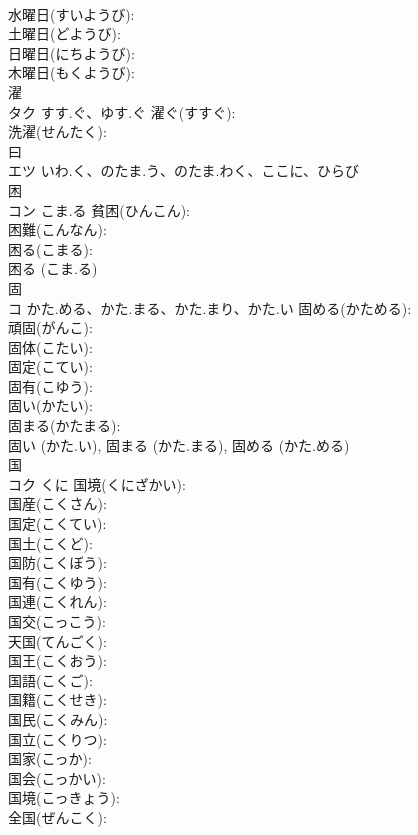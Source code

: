 \documentclass[8pt]{extreport}
\begin{document}
\begin{CJK}{UTF8}{min}
\\	水曜日(すいようび): 
\\	土曜日(どようび): 
\\	日曜日(にちようび): 
\\	木曜日(もくようび): 
\\	濯			
\\	タク	すす.ぐ、ゆす.ぐ	濯ぐ(すすぐ): 
\\	洗濯(せんたく): 
\\	曰			
\\	エツ	いわ.く、のたま.う、のたま.わく、ここに、ひらび		
\\	困			
\\	コン	こま.る	貧困(ひんこん): 
\\	困難(こんなん): 
\\	困る(こまる): 
\\	困る (こま.る)
\\	固			
\\	コ	かた.める、かた.まる、かた.まり、かた.い	固める(かためる): 
\\	頑固(がんこ): 
\\	固体(こたい): 
\\	固定(こてい): 
\\	固有(こゆう): 
\\	固い(かたい): 
\\	固まる(かたまる): 
\\	固い (かた.い), 固まる (かた.まる), 固める (かた.める)
\\	国			
\\	コク	くに	国境(くにざかい): 
\\	国産(こくさん): 
\\	国定(こくてい): 
\\	国土(こくど): 
\\	国防(こくぼう): 
\\	国有(こくゆう): 
\\	国連(こくれん): 
\\	国交(こっこう): 
\\	天国(てんごく): 
\\	国王(こくおう): 
\\	国語(こくご): 
\\	国籍(こくせき): 
\\	国民(こくみん): 
\\	国立(こくりつ): 
\\	国家(こっか): 
\\	国会(こっかい): 
\\	国境(こっきょう): 
\\	全国(ぜんこく): 

\end{CJK}
\end{document}
